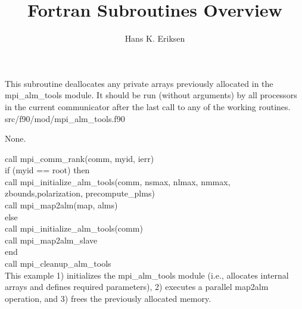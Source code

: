 
\sloppy


\title{\healpix Fortran Subroutines Overview}
 \section[mpi\_cleanup\_alm\_tools]{ }
\label{sub:mpi_cleanup_alm_tools}
\author{Hans K. Eriksen}

\begin{facility}
{This subroutine deallocates any private arrays previously allocated
in the mpi\_alm\_tools module. It should be run (without arguments) by
all processors in the current communicator after the last call to any
of the working routines. 
}
{src/f90/mod/mpi\_alm\_tools.f90}
\end{facility}

\begin{f90format}
{}
\end{f90format}

\begin{arguments}
{
None.
}
\end{arguments}

\begin{example}
{
call mpi\_comm\_rank(comm, myid, ierr)\\
if (myid == root) then\\
\hspace*{1cm}call mpi\_initialize\_alm\_tools(comm, nsmax, nlmax, nmmax, \\
\hspace*{3cm}zbounds,polarization, precompute\_plms)\\
\hspace*{1cm}call mpi\_map2alm(map, alms)\\
else \\
\hspace*{1cm}call mpi\_initialize\_alm\_tools(comm)\\
\hspace*{1cm}call mpi\_map2alm\_slave\\
end\\
call mpi\_cleanup\_alm\_tools\\
}
{
This example 1) initializes the mpi\_alm\_tools module (i.e.,
allocates internal arrays and defines required parameters), 2)
executes a parallel map2alm operation, and 3) frees the previously
allocated memory.
}
\end{example}

